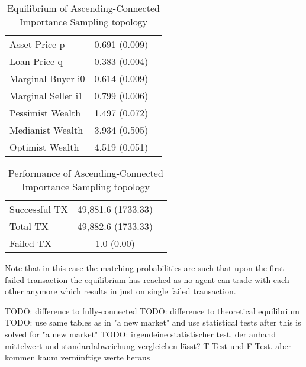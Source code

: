 \documentclass[Bachelorarbeit.tex]{subfiles}
\begin{document}
\begin{table}[H]
	\caption{Equilibrium of Ascending-Connected Importance Sampling topology}
	\centering
	\begin{tabular} { l c r }
		\hline
		Asset-Price p & 0.691 (0.009) \\
		Loan-Price q & 0.383 (0.004) \\
		Marginal Buyer i0 & 0.614 (0.009) \\
		Marginal Seller i1 & 0.799 (0.006) \\
		\hline
		Pessimist Wealth & 1.497 (0.072) \\
		Medianist Wealth & 3.934 (0.505) \\
		Optimist Wealth & 4.519 (0.051) \\
		\hline
	\end{tabular}
\end{table} 

\begin{table}[H]
	\caption{Performance of Ascending-Connected Importance Sampling topology}
	\centering
	\begin{tabular} { l c r }
		\hline
		Successful TX & 49,881.6 (1733.33) \\
		Total TX & 49,882.6 (1733.33) \\
		Failed TX & 1.0 (0.00) \\
		\hline
	\end{tabular}
\end{table}

Note that in this case the matching-probabilities are such that upon the first failed transaction the equilibrium has reached as no agent can trade with each other anymore which results in just on single failed transaction.

TODO: difference to fully-connected 
TODO: difference to theoretical equilibrium
TODO: use same tables as in "a new market" and use statistical tests after this is solved for "a new market"
TODO: irgendeine statistischer test, der anhand mittelwert und standardabweichung vergleichen lässt?
T-Test und F-Test.
aber kommen kaum vernünftige werte heraus
\end{document}
